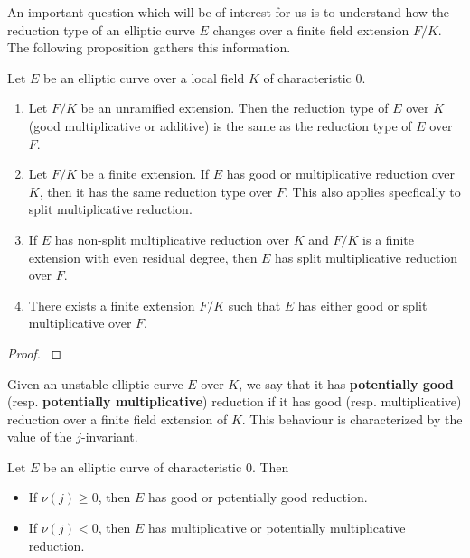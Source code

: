 An important question which will be of interest for us is to understand how the reduction type of an elliptic curve $E$ changes over a finite field extension $F/K$. The following proposition gathers this information.

\begin{prop}\label{prop_semi_red}
    Let $E$ be an elliptic curve over a local field $K$ of characteristic $0$. 
    \begin{enumerate}[label={(\roman*)}]
        \item Let $F/K$ be an unramified extension. Then the reduction type of $E$ over $K$ (good multiplicative or additive) is the same as the reduction type of $E$ over $F$.
        \item Let $F/K$ be a finite extension. If $E$ has good or multiplicative reduction over $K$, then it has the same reduction type over $F$. This also applies specfically to split multiplicative reduction.
        \item If $E$ has non-split multiplicative reduction over $K$ and $F/K$ is a finite extension with even residual degree, then $E$ has split multiplicative reduction over $F$. 
        \item There exists a finite extension $F/K$ such that $E$ has either good or split multiplicative over $F$.
    \end{enumerate}
\end{prop}
\begin{proof}
    \cite[\S VII Proposition 5.4]{S1} 
\end{proof}

Given an unstable elliptic curve $E$ over $K$, we say that it has \textbf{potentially good} (resp. \textbf{potentially multiplicative}) reduction if it has good (resp. multiplicative) reduction over a finite field extension of $K$. This behaviour is characterized by the value of the $j$-invariant.

\begin{prop}\label{prop_j_inv}
    Let $E$ be an elliptic curve of characteristic $0$. Then
    \begin{itemize}
        \item If $\nu(j)\geq0$, then $E$ has good or potentially good reduction.
        \item If $\nu(j)<0$, then $E$ has multiplicative or potentially multiplicative reduction.
    \end{itemize}
\end{prop}

